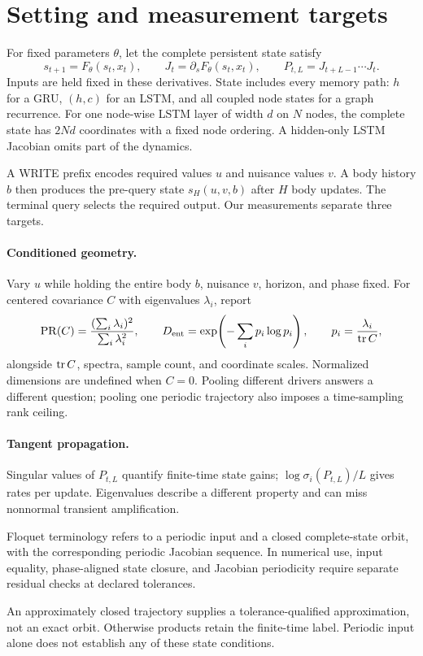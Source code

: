 \section{Setting and measurement targets}
\label{sec:setting}

For fixed parameters $\theta$, let the complete persistent state satisfy
\begin{equation}
 s_{t+1}=F_\theta(s_t,x_t),\qquad
 J_t=\partial_sF_\theta(s_t,x_t),\qquad
 P_{t,L}=J_{t+L-1}\cdots J_t .
 \label{eq:update}
\end{equation}
Inputs are held fixed in these derivatives. State includes every memory path: $h$ for a GRU, $(h,c)$ for an LSTM, and all coupled node states for a graph recurrence. For one node-wise LSTM layer of width $d$ on $N$ nodes, the complete state has $2Nd$ coordinates with a fixed node ordering. A hidden-only LSTM Jacobian omits part of the dynamics.

A WRITE prefix encodes required values $u$ and nuisance values $v$. A body history $b$ then produces the pre-query state $s_H(u,v,b)$ after $H$ body updates. The terminal query selects the required output. Our measurements separate three targets.

\paragraph{Conditioned geometry.}
Vary $u$ while holding the entire body $b$, nuisance $v$, horizon, and phase fixed. For centered covariance $C$ with eigenvalues $\lambda_i$, report
\begin{equation}
 \operatorname{PR}(C)=\frac{(\sum_i\lambda_i)^2}{\sum_i\lambda_i^2},\qquad
 D_{\mathrm{ent}}=\exp\!\left(-\sum_i p_i\log p_i\right),\qquad
 p_i=\frac{\lambda_i}{\operatorname{tr} C},
\end{equation}
alongside $\operatorname{tr} C$, spectra, sample count, and coordinate scales. Normalized dimensions are undefined when $C=0$. Pooling different drivers answers a different question; pooling one periodic trajectory also imposes a time-sampling rank ceiling.

\paragraph{Tangent propagation.}
Singular values of $P_{t,L}$ quantify finite-time state gains; $\log\sigma_i(P_{t,L})/L$ gives rates per update. Eigenvalues describe a different property and can miss nonnormal transient amplification.
\begin{definition}
\label{def:verified-orbit}
Floquet terminology refers to a periodic input and a closed complete-state orbit, with the corresponding periodic Jacobian sequence. In numerical use, input equality, phase-aligned state closure, and Jacobian periodicity require separate residual checks at declared tolerances.
\end{definition}
An approximately closed trajectory supplies a tolerance-qualified approximation, not an exact orbit. Otherwise products retain the finite-time label. Periodic input alone does not establish any of these state conditions.

